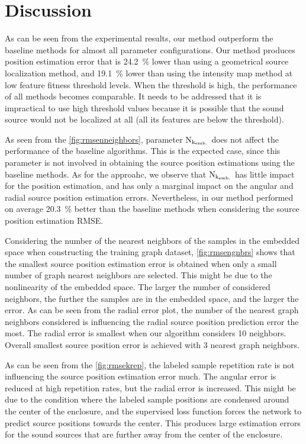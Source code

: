 \documentclass[applsci,article,submit,moreauthors,pdftex]{Definitions/mdpi}
\begin{document}
\section{Discussion}

As can be seen from the experimental results, our method outperform the baseline methods for almost all parameter configurations.
Our method produces position estimation error that is \SI{24.2}{\percent} lower than using a geometrical source localization method, and \SI{19.1}{\percent} lower than using the intensity map method at low feature fitness threshold levels. When the threshold is high, the performance of all methods becomes comparable. It needs to be addressed that it is impractical to use high threshold values because it is possible that the sound source would not be localized at all (all its features are below the threshold).

As seen from the \figurename{} \ref{fig:rmsenneighbors}, parameter $ \mathrm{N}_{\mathrm{k}_{\mathrm{emb.}}} $ does not affect the performance of the baseline algorithms. This is the expected case, since this parameter is not involved in obtaining the source position estimations using the baseline methods.
As for the \grnn{} approahc, we observe that $ \mathrm{N}_{\mathrm{k}_{\mathrm{emb.}}} $ has little impact for the position estimation, and has only a marginal impact on the angular and radial source position estimation errors.
Nevertheless, in our method performed on average \SI{20.3}{\percent} better than the baseline methods when considering the source position estimation RMSE.


Considering the number of the nearest neighbors of the samples in the embedded space when constructing the training graph dataset, \figurename{} \ref{fig:rmsengnbrs} shows that the smallest source position estimation error is obtained when only a small number of graph nearest neighbors are selected. This might be due to the nonlinearity of the embedded space. The larger the number of considered neighbors, the further the samples are in the embedded space, and the larger the error.
As can be seen from the radial error plot, the number of the nearest graph neighbors considered is influencing the radial source position prediction error the most. The radial error is smallest when our algorithm considers 10 neighbors. 
Overall smallest source position error is achieved with 3 nearest graph neighbors.

As can be seen from the \figurename{} \ref{fig:rmsekrep}, the labeled sample repetition rate is not influencing the source position estimation error much. The angular error is reduced at high repetition rates, but the radial error is increased. This might be due to the condition where the labeled sample positions are condensed around the center of the enclosure, and the supervised loss function forces the network to predict source positions towards the center. This produces large estimation errors for the sound sources that are further away from the center of the enclosure.
\end{document}
